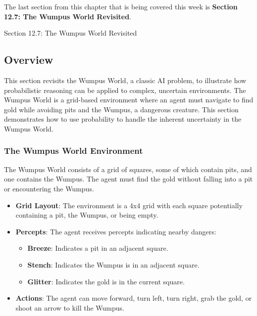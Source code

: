 The last section from this chapter that is being covered this week is \textbf{Section 12.7: The Wumpus World Revisited}.

\begin{notes}{Section 12.7: The Wumpus World Revisited}
    \subsection*{Overview}

    This section revisits the Wumpus World, a classic AI problem, to illustrate how probabilistic reasoning can be applied to complex, uncertain environments. The Wumpus World is a grid-based environment 
    where an agent must navigate to find gold while avoiding pits and the Wumpus, a dangerous creature. This section demonstrates how to use probability to handle the inherent uncertainty in the Wumpus World.
    
    \subsubsection*{The Wumpus World Environment}
    
    The Wumpus World consists of a grid of squares, some of which contain pits, and one contains the Wumpus. The agent must find the gold without falling into a pit or encountering the Wumpus.
    
    \begin{highlight}
    
        \begin{itemize}
            \item \textbf{Grid Layout}: The environment is a 4x4 grid with each square potentially containing a pit, the Wumpus, or being empty.
            \item \textbf{Percepts}: The agent receives percepts indicating nearby dangers:
                \begin{itemize}
                    \item \textbf{Breeze}: Indicates a pit in an adjacent square.
                    \item \textbf{Stench}: Indicates the Wumpus is in an adjacent square.
                    \item \textbf{Glitter}: Indicates the gold is in the current square.
                \end{itemize}
            \item \textbf{Actions}: The agent can move forward, turn left, turn right, grab the gold, or shoot an arrow to kill the Wumpus.
        \end{itemize}
    

\end{highlight}
\end{notes}
